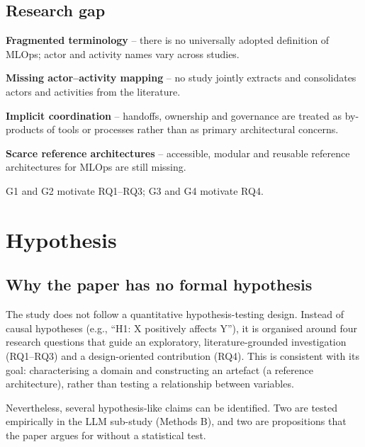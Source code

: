 \documentclass[11pt,a4paper]{article}
\begin{document}
\subsection{Research gap}

\begin{callout}
\begin{description}[leftmargin=1.4cm,style=nextline]
  \item[G1.] \textbf{Fragmented terminology} -- there is no universally adopted definition of MLOps; actor and activity names vary across studies.
  \item[G2.] \textbf{Missing actor--activity mapping} -- no study jointly extracts and consolidates actors and activities from the literature.
  \item[G3.] \textbf{Implicit coordination} -- handoffs, ownership and governance are treated as by-products of tools or processes rather than as primary architectural concerns.
  \item[G4.] \textbf{Scarce reference architectures} -- accessible, modular and reusable reference architectures for MLOps are still missing.
\end{description}
\end{callout}

G1 and G2 motivate RQ1--RQ3; G3 and G4 motivate RQ4.

\section{Hypothesis}\label{sec:hyp}

\subsection{Why the paper has no formal hypothesis}

The study does not follow a quantitative hypothesis-testing design. Instead of causal hypotheses (e.g., ``H1: X positively affects Y''), it is organised around four research questions that guide an exploratory, literature-grounded investigation (RQ1--RQ3) and a design-oriented contribution (RQ4). This is consistent with its goal: characterising a domain and constructing an artefact (a reference architecture), rather than testing a relationship between variables.

Nevertheless, several hypothesis-like claims can be identified. Two are tested empirically in the LLM sub-study (Methods B), and two are propositions that the paper argues for without a statistical test.
\end{document}
